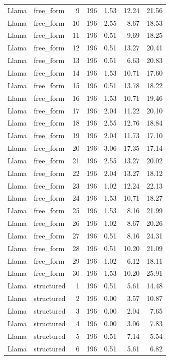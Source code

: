 \begin{longtable}{llrrrrr}
Llama & free\_form & 9 & 196 & 1.53 & 12.24 & 21.56 \\
Llama & free\_form & 10 & 196 & 2.55 & 8.67 & 18.53 \\
Llama & free\_form & 11 & 196 & 0.51 & 9.69 & 18.25 \\
Llama & free\_form & 12 & 196 & 0.51 & 13.27 & 20.41 \\
Llama & free\_form & 13 & 196 & 0.51 & 6.63 & 20.83 \\
Llama & free\_form & 14 & 196 & 1.53 & 10.71 & 17.60 \\
Llama & free\_form & 15 & 196 & 0.51 & 13.78 & 18.22 \\
Llama & free\_form & 16 & 196 & 1.53 & 10.71 & 19.46 \\
Llama & free\_form & 17 & 196 & 2.04 & 11.22 & 20.10 \\
Llama & free\_form & 18 & 196 & 2.55 & 12.76 & 18.84 \\
Llama & free\_form & 19 & 196 & 2.04 & 11.73 & 17.10 \\
Llama & free\_form & 20 & 196 & 3.06 & 17.35 & 17.14 \\
Llama & free\_form & 21 & 196 & 2.55 & 13.27 & 20.02 \\
Llama & free\_form & 22 & 196 & 2.04 & 13.27 & 18.12 \\
Llama & free\_form & 23 & 196 & 1.02 & 12.24 & 22.13 \\
Llama & free\_form & 24 & 196 & 1.53 & 10.71 & 18.27 \\
Llama & free\_form & 25 & 196 & 1.53 & 8.16 & 21.99 \\
Llama & free\_form & 26 & 196 & 1.02 & 8.67 & 20.26 \\
Llama & free\_form & 27 & 196 & 0.51 & 8.16 & 24.31 \\
Llama & free\_form & 28 & 196 & 0.51 & 10.20 & 21.09 \\
Llama & free\_form & 29 & 196 & 1.02 & 6.12 & 18.11 \\
Llama & free\_form & 30 & 196 & 1.53 & 10.20 & 25.91 \\
Llama & structured & 1 & 196 & 0.51 & 5.61 & 14.48 \\
Llama & structured & 2 & 196 & 0.00 & 3.57 & 10.87 \\
Llama & structured & 3 & 196 & 0.00 & 2.04 & 7.65 \\
Llama & structured & 4 & 196 & 0.00 & 3.06 & 7.83 \\
Llama & structured & 5 & 196 & 0.51 & 7.14 & 5.54 \\
Llama & structured & 6 & 196 & 0.51 & 5.61 & 6.82 \\

\end{longtable}
